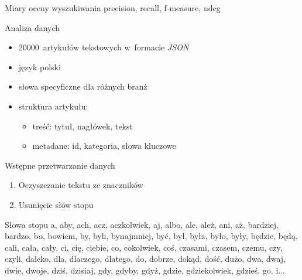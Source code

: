 \documentclass{beamer}
\begin{document}
	\begin{frame}{{Miary oceny wyszukiwania}}
		precision, recall, f-measure, ndcg
	\end{frame}	

	\begin{frame}{Analiza danych}
		\begin{itemize}
			\item 20000~artykułów tekstowych w~formacie \textit{JSON}
			\item język polski
			\item słowa specyficzne dla różnych branż
			\item struktura artykułu:
			\begin{itemize}
				\item treść: tytuł, nagłówek, tekst
				\item metadane: id, kategoria, słowa kluczowe
			\end{itemize}
		\end{itemize}
	\end{frame}
	\begin{frame}{Wstępne przetwarzanie danych}
		\begin{enumerate}
			\item Oczyszczanie tekstu ze znaczników \pause
			\item Usunięcie słów stopu
		\end{enumerate}
	\end{frame}
	\begin{frame}{Słowa stopu}
		a, aby, ach, acz, aczkolwiek, aj, albo, ale, ależ, ani, aż, bardziej, bardzo, bo, bowiem, by, byli, bynajmniej, być, był, była, było, były, będzie, będą, cali, cała, cały, ci, cię, ciebie, co, cokolwiek, coś, czasami, czasem, czemu, czy, czyli, daleko, dla, dlaczego, dlatego, do, dobrze, dokąd, dość, dużo, dwa, dwaj, dwie, dwoje, dziś, dzisiaj, gdy, gdyby, gdyż, gdzie, gdziekolwiek, gdzieś, go, i...
	\end{frame}
\end{document}

